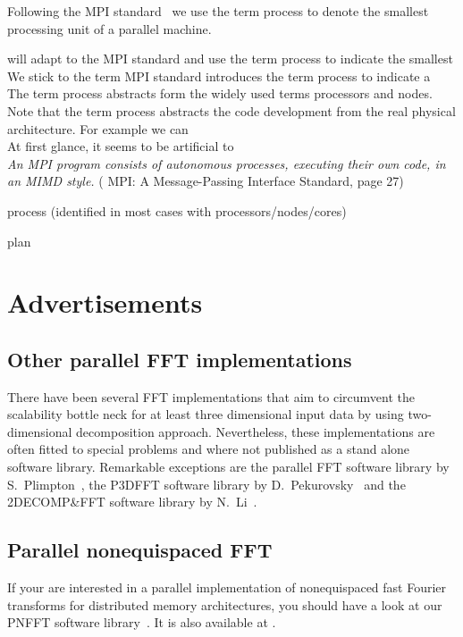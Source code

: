Following the MPI standard~\cite{MPI-2.2} we use the term process to denote the smallest
processing unit of a parallel machine.

will adapt to the MPI standard and use the term process to indicate the smallest \\

We stick to the term MPI standard introduces the term process to indicate a \\
The term process abstracts form the widely used terms processors and nodes. \\
Note that the term process abstracts the code development from the real physical architecture. For example we can \\
At first glance, it seems to be artificial to \\
\emph{An MPI program consists of autonomous processes, executing their own code, in an MIMD style.}
( MPI: A Message-Passing Interface Standard, page 27)
\begin{compactitem}
  \item process (identified in most cases with processors/nodes/cores)
  \item plan
\end{compactitem}



\section{Advertisements}
\subsection{Other parallel FFT implementations}
There have been several FFT implementations that aim to circumvent the scalability bottle neck
for at least three dimensional input data by using two-dimensional decomposition approach.
Nevertheless, these implementations are often fitted to special problems and where not published
as a stand alone software library. Remarkable exceptions are the parallel FFT software library by S.~Plimpton~\cite{Pl97,sandiafft},
the P3DFFT software library by D.~Pekurovsky~\cite{Pe12,p3dfft} and the \mbox{2DECOMP\&FFT} software library by N.~Li~\cite{Li2010, 2decompfft}.

\subsection{Parallel nonequispaced FFT}
If your are interested in a parallel implementation of nonequispaced fast Fourier
transforms for distributed memory architectures, you should have a look at our PNFFT software library~\cite{pnfft, PiPo13}.
It is also available at \websoft.

